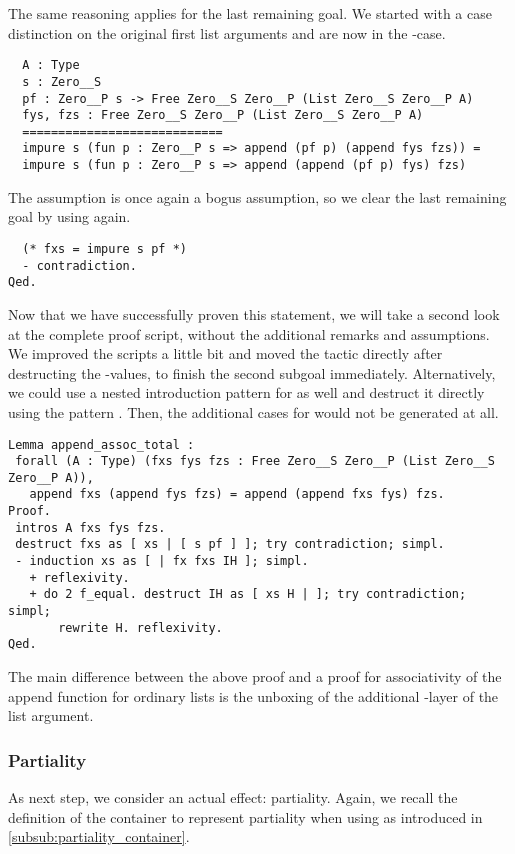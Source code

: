 The same reasoning applies for the last remaining goal.
We started with a case distinction on the original first list arguments  and are now in the -case.

\begin{verbatim}
  A : Type
  s : Zero__S
  pf : Zero__P s -> Free Zero__S Zero__P (List Zero__S Zero__P A)
  fys, fzs : Free Zero__S Zero__P (List Zero__S Zero__P A)
  ============================
  impure s (fun p : Zero__P s => append (pf p) (append fys fzs)) =
  impure s (fun p : Zero__P s => append (append (pf p) fys) fzs)
\end{verbatim}

The assumption  is once again a bogus assumption, so we clear the last remaining goal by using  again.

\begin{verbatim}
  (* fxs = impure s pf *)
  - contradiction.
Qed.
\end{verbatim}

Now that we have successfully proven this statement, we will take a second look at the complete proof script, without the additional remarks and assumptions.
We improved the scripts a little bit and moved the  tactic directly after destructing the -values, to finish the second subgoal immediately.
Alternatively, we could use a nested introduction pattern for  as well and destruct it directly using the pattern \cinl{[]}.
Then, the additional cases for  would not be generated at all.

\begin{verbatim}
Lemma append_assoc_total :
 forall (A : Type) (fxs fys fzs : Free Zero__S Zero__P (List Zero__S Zero__P A)),
   append fxs (append fys fzs) = append (append fxs fys) fzs.
Proof.
 intros A fxs fys fzs.
 destruct fxs as [ xs | [ s pf ] ]; try contradiction; simpl.
 - induction xs as [ | fx fxs IH ]; simpl.
   + reflexivity.
   + do 2 f_equal. destruct IH as [ xs H | ]; try contradiction; simpl;
       rewrite H. reflexivity.
Qed.
\end{verbatim}

The main difference between the above proof and a proof for associativity of the append function for ordinary lists is the unboxing of the additional -layer of the list argument.

\subsubsection{Partiality}
As next step, we consider an actual effect: partiality.
Again, we recall the definition of the container to represent partiality when using  as introduced in \autoref{subsub:partiality_container}.

